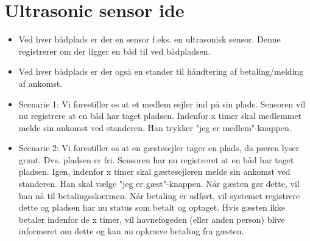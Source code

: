\section{Ultrasonic sensor ide} %
\label{sec:Ultrasonic sensor ide}

\begin{itemize}
  \item Ved hver bådplads er der en sensor f.eks. en ultrasonisk sensor. Denne registrerer om der ligger en båd til ved bådpladsen.
  \item Ved hver bådplads er der også en stander til håndtering af betaling/melding af ankomst.
  \item Scenarie 1: Vi forestiller os at et medlem sejler ind på sin plads. Sensoren vil nu registrere at en båd har taget pladsen. Indenfor x timer skal medlemmet melde sin ankomst ved standeren. Han trykker "jeg er medlem"-knappen. 
  \item Scenarie 2: Vi forestiller os at en gæstesejler tager en plads, da pæren lyser grønt. Dvs. pladsen er fri. Sensoren har nu registreret at en båd har taget pladsen. Igen, indenfor x timer skal gæstesejleren melde sin ankomst ved standeren. Han skal vælge "jeg er gæst"-knappen. Når gæsten gør dette, vil han nå til betalingsskærmen. Når betaling er udført, vil systemet registrere dette og pladsen har nu status som betalt og optaget. Hvis gæsten ikke betaler indenfor de x timer, vil havnefogeden (eller anden person) blive informeret om dette og kan nu opkræve betaling fra gæsten. 
\end{itemize}

